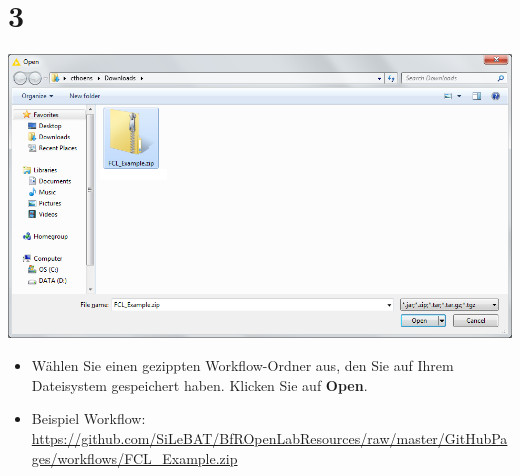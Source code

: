 \documentclass{beamer}
\begin{document}
\section{3}
\begin{frame}
	\begin{center}
  		\includegraphics[height=0.6\textheight]{3.png}
	\end{center}
	\begin{itemize}
		\item Wählen Sie einen gezippten Workflow-Ordner aus, den Sie auf Ihrem Dateisystem gespeichert haben. Klicken Sie auf \textbf{Open}.
		\item Beispiel Workflow: \url{https://github.com/SiLeBAT/BfROpenLabResources/raw/master/GitHubPages/workflows/FCL_Example.zip}
	\end{itemize}
\end{frame}
\end{document}
